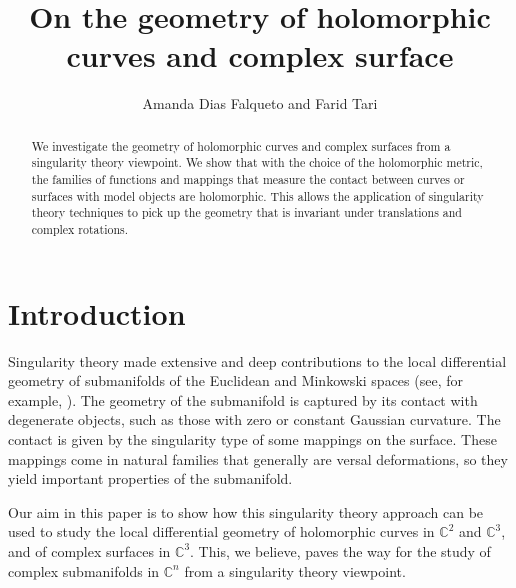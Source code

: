 \documentclass[12pt,a4paper]{article}
\begin{document}
	
	
	
\title{On the geometry of holomorphic curves and complex surface}
\author{Amanda Dias Falqueto and Farid Tari}

	
\maketitle
\begin{abstract}
We investigate the geometry of holomorphic curves and complex surfaces from a singularity theory viewpoint.
We show that with the choice of the holomorphic metric, the families of functions and mappings that measure the contact between curves or surfaces with model objects are holomorphic. This allows the application of singularity theory techniques to pick up the geometry that is invariant under translations and complex rotations.
\end{abstract}
	
	
	
\noindent \makebox [40mm]{\hrulefill}
	
	
\section{Introduction}\label{sec:intro}

Singularity theory made extensive and deep contributions to the local differential geometry of submanifolds of the Euclidean and Minkowski spaces (see, for example, \cite{BG,Cipolla_Gilin,Damon_Giblin_Haslinger,IRRT,Izu,Porteous}). The geometry of the submanifold is captured by its contact with degenerate objects, such as those with zero or constant Gaussian curvature.
The contact is given by the singularity type of some mappings on the surface. These mappings come in natural families that generally are versal deformations, so they yield important properties of the submanifold. 

Our aim in this paper is to show how this singularity theory approach can be used to study the local differential geometry of holomorphic curves in $\mathbb C^2$ and $\mathbb C^3$, and of complex surfaces in $\mathbb C^3$. This, we believe, paves the way for the study of complex submanifolds in $\mathbb C^n$ from a singularity theory viewpoint.
\end{document}
